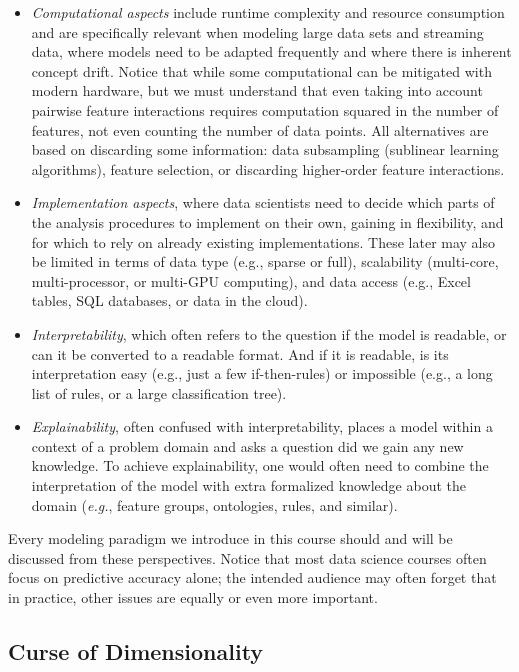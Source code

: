 \begin{refsection}
\begin{itemize}
\item {\em Computational aspects} include runtime complexity and resource consumption and are specifically relevant when modeling large data sets and streaming data, where models need to be adapted frequently and where there is inherent concept drift. Notice that while some computational can be mitigated with modern hardware, but we must understand that even taking into account pairwise feature interactions requires computation squared in the number of features, not even counting the number of data points. All alternatives are based on discarding some information: data subsampling (sublinear learning algorithms), feature selection, or discarding higher-order feature interactions.
\item {\em Implementation aspects}, where data scientists need to decide which parts of the analysis procedures to implement on their own, gaining in flexibility, and for which to rely on already existing implementations. These later may also be limited in terms of data type (e.g., sparse or full), scalability (multi-core, multi-processor, or multi-GPU computing), and data access (e.g., Excel tables, SQL databases, or data in the cloud).
\item {\em Interpretability}, which often refers to the question if the model is readable, or can it be converted to a readable format. And if it is readable, is its interpretation easy (e.g., just a few if-then-rules) or impossible (e.g., a long list of rules, or a large classification tree).
\item {\em Explainability}, often confused with interpretability, places a model within a context of a problem domain and asks a question did we gain any new knowledge. To achieve explainability, one would often need to combine the interpretation of the model with extra formalized knowledge about the domain ({\em e.g.}, feature groups, ontologies, rules, and similar).
\end{itemize}

Every modeling paradigm we introduce in this course should and will be discussed from these perspectives. Notice that most data science courses often focus on predictive accuracy alone; the intended audience may often forget that in practice, other issues are equally or even more important.

\subsection*{Curse of Dimensionality}


\end{refsection}

